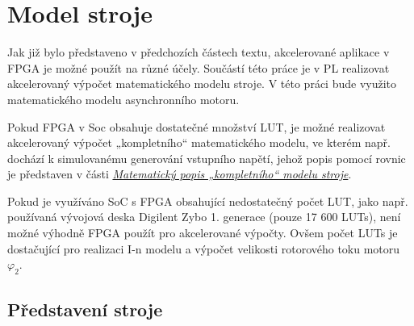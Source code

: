 \documentclass[a4paper, twoside, 11pt]{article}
\begin{document}
\section{Model stroje}
	Jak již bylo představeno v předchozích částech textu, akcelerované aplikace v FPGA je možné použít na různé účely. Součástí této práce je v PL realizovat akcelerovaný výpočet matematického modelu stroje. V této práci bude využito matematického modelu asynchronního motoru.\par
	Pokud FPGA v Soc obsahuje dostatečné množství LUT, je možné realizovat akcelerovaný výpočet „kompletního“ matematického modelu, ve kterém např. dochází k simulovanému generování vstupního napětí, jehož popis pomocí rovnic je představen v části \hyperref[subsec:matematicky-popis-kompletniho-modelu-stroje]{\textit{Matematický popis „kompletního“ modelu stroje}}.\par
	Pokud je využíváno SoC s FPGA obsahující nedostatečný počet LUT, jako např. používaná vývojová deska Digilent Zybo 1. generace (pouze 17 600 LUTs), není možné výhodně FPGA použít pro akcelerované výpočty. Ovšem počet LUTs je dostačující pro realizaci I-n modelu a výpočet velikosti rotorového toku motoru $\varphi_2$.
	\subsection{Představení stroje}
\end{document}

